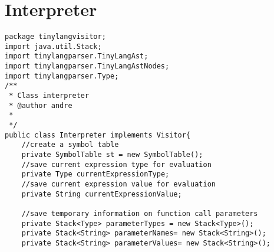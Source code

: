 \section{Interpreter}
\begin{lstlisting}[basicstyle=\miniscule,caption=Interpreter,label=listing:interpreter]
package tinylangvisitor;
import java.util.Stack;
import tinylangparser.TinyLangAst;
import tinylangparser.TinyLangAstNodes;
import tinylangparser.Type;
/**
 * Class interpreter
 * @author andre
 *
 */
public class Interpreter implements Visitor{
	//create a symbol table
	private SymbolTable st = new SymbolTable();
	//save current expression type for evaluation
	private Type currentExpressionType;
	//save current expression value for evaluation
	private String currentExpressionValue;
	
	//save temporary information on function call parameters
	private Stack<Type> parameterTypes = new Stack<Type>();
	private Stack<String> parameterNames= new Stack<String>();
	private Stack<String> parameterValues= new Stack<String>();


\end{lstlisting}
